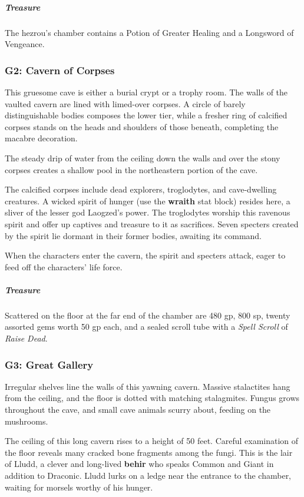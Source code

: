 \documentclass[10pt,a4paper,twoside,bg=print,twocolumn,openany,nodeprecatedcode]{dndbook}
\begin{document}
\subparagraph{Treasure}
The hezrou's chamber contains a Potion of Greater Healing and a Longsword of Vengeance.

\subsubsection{G2: Cavern of Corpses}
\begin{DndReadAloud}{}
This gruesome cave is either a burial crypt or a trophy room. The walls of the vaulted cavern are lined with limed-over corpses. A circle of barely distinguishable bodies composes the lower tier, while a fresher ring of calcified corpses stands on the heads and shoulders of those beneath, completing the macabre decoration.

The steady drip of water from the ceiling down the walls and over the stony corpses creates a shallow pool in the northeastern portion of the cave.

\end{DndReadAloud}

The calcified corpses include dead explorers, troglodytes, and cave-dwelling creatures. A wicked spirit of hunger (use the \textbf{wraith} stat block) resides here, a sliver of the lesser god Laogzed's power. The troglodytes worship this ravenous spirit and offer up captives and treasure to it as sacrifices. Seven specters created by the spirit lie dormant in their former bodies, awaiting its command.

When the characters enter the cavern, the spirit and specters attack, eager to feed off the characters' life force.

\subparagraph{Treasure}
Scattered on the floor at the far end of the chamber are 480 gp, 800 sp, twenty assorted gems worth 50 gp each, and a sealed scroll tube with a \textit{Spell Scroll} of \textit{Raise Dead}.

\subsubsection{G3: Great Gallery}
\begin{DndReadAloud}{}
Irregular shelves line the walls of this yawning cavern. Massive stalactites hang from the ceiling, and the floor is dotted with matching stalagmites. Fungus grows throughout the cave, and small cave animals scurry about, feeding on the mushrooms.

\end{DndReadAloud}

The ceiling of this long cavern rises to a height of 50 feet. Careful examination of the floor reveals many cracked bone fragments among the fungi. This is the lair of Lludd, a clever and long-lived \textbf{behir} who speaks Common and Giant in addition to Draconic. Lludd lurks on a ledge near the entrance to the chamber, waiting for morsels worthy of his hunger.
\end{document}
